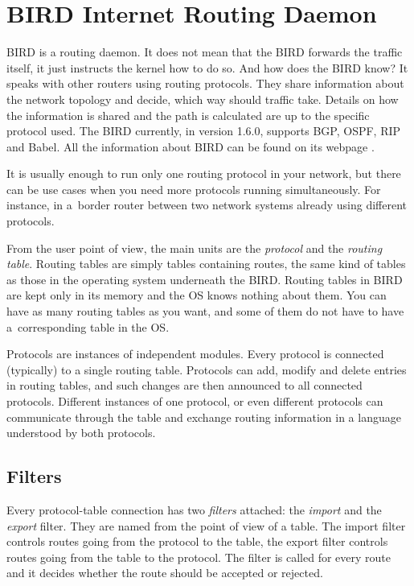\chapter{BIRD Internet Routing Daemon}

BIRD is a routing daemon. It does not mean that the BIRD forwards the traffic
itself, it just instructs the kernel how to do so. And how does the BIRD know?
It speaks with other routers using routing protocols. They share information
about the network topology and decide, which way should traffic take. Details
on how the information is shared and the path is calculated are up to the
specific protocol used. The BIRD currently, in version 1.6.0, supports BGP,
OSPF, RIP and Babel. All the information about BIRD can be found on its webpage
\cite{birdweb}.

It is usually enough to run only one routing protocol in your network, but there
can be use cases when you need more protocols running simultaneously. For instance, in a~border
router between two network systems already using different protocols.

From the user point of view, the main units are the \emph{protocol} and the
\emph{routing table}. Routing tables are simply tables containing routes, the
same kind of tables as those in the operating system underneath the BIRD.
Routing tables in BIRD are kept only in its memory and the OS knows nothing
about them. You can have as many routing tables as you want, and some of them do
not have to have a~corresponding table in the OS.

Protocols are instances of independent modules. Every protocol is connected
(typically) to a single routing table. Protocols can add, modify and delete entries
in routing tables, and such changes are then announced to all connected
protocols. Different instances of one protocol, or even different protocols can
communicate through the table and exchange routing information in a language
understood by both protocols.

\section{Filters}
Every protocol-table connection has two \emph{filters} attached: the
\emph{import} and the \emph{export} filter. They are named from the point of
view of a table. The import filter controls routes going from the protocol to
the table, the export filter controls routes going from the table to the
protocol. The filter is called for every route and it decides whether the route
should be accepted or rejected.

